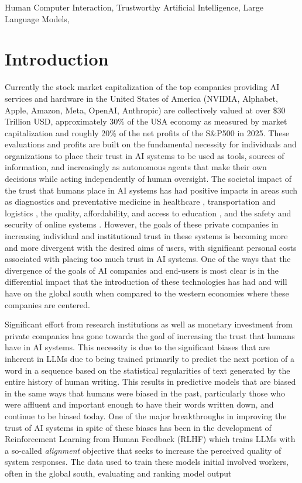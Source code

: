 \documentclass[a4paper,fleqn]{cas-sc}
\begin{document}
\begin{keywords}
Human Computer Interaction, 
Trustworthy Artificial Intelligence, 
Large Language Models, 
\end{keywords}
\maketitle

\section{Introduction}
Currently the stock market capitalization of the top companies providing AI services and hardware in the United States of America (NVIDIA, Alphabet, Apple, Amazon, Meta, OpenAI, Anthropic) are collectively valued at over \$30 Trillion USD, approximately 30\% of the USA economy as measured by market capitalization and roughly 20\% of the net profits of the S\&P500 in 2025. These evaluations and profits are built on the fundamental necessity for individuals and organizations to place their trust in AI systems to be used as tools, sources of information, and increasingly as autonomous agents that make their own decisions while acting independently of human oversight. The societal impact of the trust that humans place in AI systems has had positive impacts in areas such as diagnostics and preventative medicine in healthcare \cite{}, transportation and logistics \cite{}, the quality, affordability, and access to education \cite{}, and the safety and security of online systems \cite{}. However, the goals of these private companies in increasing individual and institutional trust in these systems is becoming more and more divergent with the desired aims of users, with significant personal costs associated with placing too much trust in AI systems. One of the ways that the divergence of the goals of AI companies and end-users is most clear is in the differential impact that the introduction of these technologies has had and will have on the global south when compared to the western economies where these companies are centered. 

Significant effort from research institutions as well as monetary investment from private companies has gone towards the goal of increasing the trust that humans have in AI systems. This necessity is due to the significant biases that are inherent in LLMs due to being trained primarily to predict the next portion of a word in a sequence based on the statistical regularities of text generated by the entire history of human writing. This results in predictive models that are biased in the same ways that humans were biased in the past, particularly those who were affluent and important enough to have their words written down, and continue to be biased today. One of the major breakthroughs in improving the trust of AI systems in spite of these biases has been in the development of Reinforcement Learning from Human Feedback (RLHF) which trains LLMs with a so-called \textit{alignment} objective that seeks to increase the perceived quality of system responses. The data used to train these models initial involved workers, often in the global south, evaluating and ranking model output 
\end{document}
